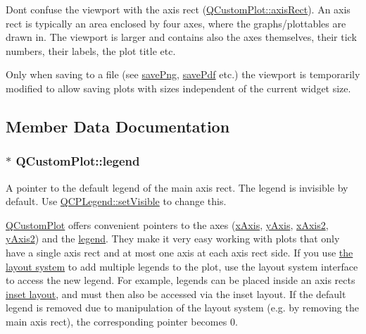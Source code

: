 Don\textquotesingle{}t confuse the viewport with the axis rect (\hyperlink{class_q_custom_plot_a4a37a1add5fe63060ac518cf0a4c4050}{Q\+Custom\+Plot\+::axis\+Rect}). An axis rect is typically an area enclosed by four axes, where the graphs/plottables are drawn in. The viewport is larger and contains also the axes themselves, their tick numbers, their labels, the plot title etc.

Only when saving to a file (see \hyperlink{class_q_custom_plot_a7636261aff1f6d25c9da749ece3fc8b8}{save\+Png}, \hyperlink{class_q_custom_plot_a632da44c6d94ea8b271eb483b08b5114}{save\+Pdf} etc.) the viewport is temporarily modified to allow saving plots with sizes independent of the current widget size. 

\subsection{Member Data Documentation}
\subsubsection[{\texorpdfstring{legend}{legend}}]{ $\ast$ Q\+Custom\+Plot\+::legend}\hypertarget{class_q_custom_plot_a4eadcd237dc6a09938b68b16877fa6af}{}\label{class_q_custom_plot_a4eadcd237dc6a09938b68b16877fa6af}
A pointer to the default legend of the main axis rect. The legend is invisible by default. Use \hyperlink{class_q_c_p_layerable_a3bed99ddc396b48ce3ebfdc0418744f8}{Q\+C\+P\+Legend\+::set\+Visible} to change this.

\hyperlink{class_q_custom_plot}{Q\+Custom\+Plot} offers convenient pointers to the axes (\hyperlink{class_q_custom_plot_a9a79cd0158a4c7f30cbc702f0fd800e4}{x\+Axis}, \hyperlink{class_q_custom_plot_af6fea5679725b152c14facd920b19367}{y\+Axis}, \hyperlink{class_q_custom_plot_ada41599f22cad901c030f3dcbdd82fd9}{x\+Axis2}, \hyperlink{class_q_custom_plot_af13fdc5bce7d0fabd640f13ba805c0b7}{y\+Axis2}) and the \hyperlink{class_q_custom_plot_a4eadcd237dc6a09938b68b16877fa6af}{legend}. They make it very easy working with plots that only have a single axis rect and at most one axis at each axis rect side. If you use \hyperlink{}{the layout system} to add multiple legends to the plot, use the layout system interface to access the new legend. For example, legends can be placed inside an axis rect\textquotesingle{}s \hyperlink{class_q_c_p_axis_rect_a4114887c7141b59650b7488f930993e5}{inset layout}, and must then also be accessed via the inset layout. If the default legend is removed due to manipulation of the layout system (e.\+g. by removing the main axis rect), the corresponding pointer becomes 0. 

